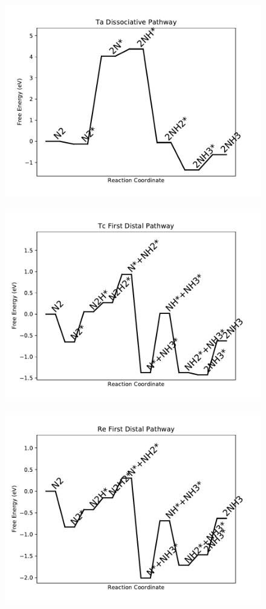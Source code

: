 \begin{figure}
\includegraphics[width=0.8\linewidth]{data/plots/Ta_dissociative.pdf}
\label{fig:Ta_dissociative}
\end{figure}

\begin{figure}
\includegraphics[width=0.8\linewidth]{data/plots/Tc_distal_1.pdf}
\label{fig:Tc_distal_1}
\end{figure}

\begin{figure}
\includegraphics[width=0.8\linewidth]{data/plots/Re_distal_1.pdf}
\label{fig:Re_distal_1}
\end{figure}

